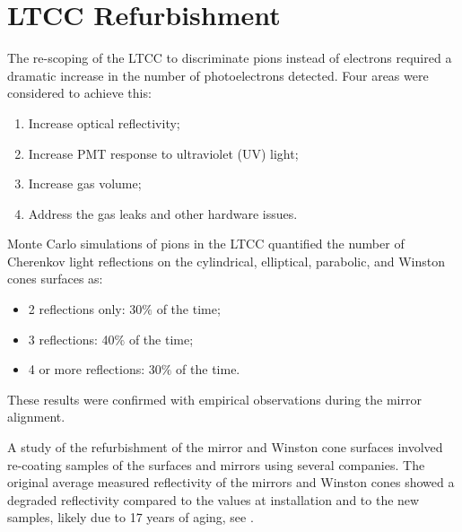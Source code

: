 \section{LTCC Refurbishment}

The re-scoping of the LTCC to discriminate pions instead of electrons required a dramatic increase in the
number of photoelectrons detected. Four areas were considered to achieve this:

\begin{enumerate}
	\item Increase optical reflectivity;
	\item Increase PMT response to ultraviolet (UV) light;
	\item Increase gas volume;
	\item Address the gas leaks and other hardware issues.
\end{enumerate}

Monte Carlo simulations of pions in the LTCC quantified the number of Cherenkov light  reflections on the cylindrical,
elliptical, parabolic, and Winston cones surfaces as:

\begin{itemize}
	\item 2 reflections only: 30$\%$ of the time;
	\item 3 reflections: 40$\%$ of the time;
	\item 4 or more reflections: 30$\%$ of the time.
\end{itemize}

\noindent
These results were confirmed with empirical observations during the mirror alignment.

A study of the refurbishment of the mirror and Winston cone surfaces
involved re-coating samples of the surfaces and mirrors using several companies.
The original average measured reflectivity of the mirrors and Winston cones
showed a degraded reflectivity compared to the values at installation and to
the new samples, likely due to  17 years of aging, see .


